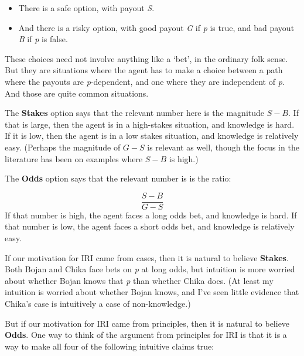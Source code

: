 \begin{itemize}
\item There is a safe option, with payout \emph{S}.

\item And there is a risky option, with good payout \emph{G} if \emph{p} is true, and bad payout \emph{B} if \emph{p} is false.

\end{itemize}
These choices need not involve anything like a `bet', in the ordinary folk sense. But they are situations where the agent has to make a choice between a path where the payouts are \emph{p}-dependent, and one where they are independent of \emph{p}. And those are quite common situations. 

The \textbf{Stakes} option says that the relevant number here is the magnitude $S-B$. If that is large, then the agent is in a high-stakes situation, and knowledge is hard. If it is low, then the agent is in a low stakes situation, and knowledge is relatively easy. (Perhaps the magnitude of $G-S$ is relevant as well, though the focus in the literature has been on examples where $S-B$ is high.)

The \textbf{Odds} option says that the relevant number is is the ratio:

$$\frac{S-B}{G-S}$$
If that number is high, the agent faces a long odds bet, and knowledge is hard. If that number is low, the agent faces a short odds bet, and knowledge is relatively easy.

If our motivation for IRI came from cases, then it is natural to believe \textbf{Stakes}. Both Bojan and Chika face bets on \emph{p} at long odds, but intuition is more worried about whether Bojan knows that \emph{p} than whether Chika does. (At least my intuition is worried about whether Bojan knows, and I've seen little evidence that Chika's case is intuitively a case of non-knowledge.)

But if our motivation for IRI came from principles, then it is natural to believe \textbf{Odds}. One way to think of the argument from principles for IRI is that it is a way to make all four of the following intuitive claims true:

